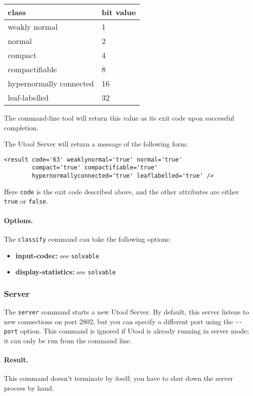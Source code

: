 \begin{center}
\begin{tabular}{l|l}
class & bit value \\ \hline
weakly normal & 1 \\
normal & 2 \\
compact & 4 \\
compactifiable & 8 \\
hypernormally connected & 16 \\
leaf-labelled & 32
\end{tabular}
\end{center}

The command-line tool will return this value as its exit code upon
successful completion.

The Utool Server will return a message of the following form:
\begin{verbatim}
<result code='63' weaklynormal='true' normal='true'
        compact='true' compactifiable='true'
        hypernormallyconnected='true' leaflabelled='true' />
\end{verbatim}

Here \verb?code? is the exit code described above, and the other
attributes are either \verb?true? or \verb?false?.


\paragraph{Options.}
The \verb?classify? command can take the following options:
\begin{itemize}
\item \textbf{input-codec:} see \verb?solvable? 
\item \textbf{display-statistics:} see \verb?solvable?
\end{itemize}



\subsubsection{Server}

The \verb?server? command starts a new Utool Server. By default, this
server listens to new connections on port 2802, but you can specify a
different port using the \verb?--port? option. This command is ignored
if Utool is already running in server mode; it can only be run from
the command line.

\paragraph{Result.} This command doesn't terminate by itself; you have
to shut down the server process by hand.

